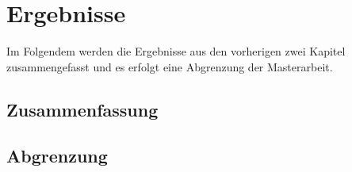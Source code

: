 \chapter{Ergebnisse}
\label{chapter:results}
Im Folgendem werden die Ergebnisse aus den vorherigen zwei Kapitel zusammengefasst und es erfolgt eine Abgrenzung der Masterarbeit.

\section{Zusammenfassung}


\section{Abgrenzung}


